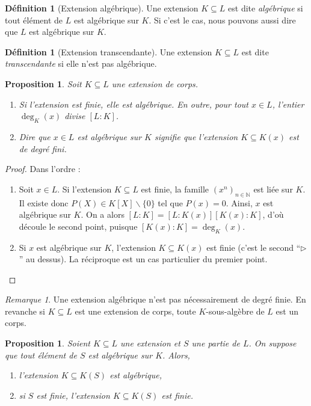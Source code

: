 \documentclass[a4paper, titlepage]{article}
\newtheorem{prop}[theo]{Proposition}
\theoremstyle{definition}
\newtheorem{defi}[theo]{Définition}
\theoremstyle{remark}
\newtheorem{rema}[theo]{Remarque}
\def\N{\mathbb N}
\begin{document}
\begin{defi}[Extension algébrique] Une extension $K \subseteq L$ est dite \textit{algébrique} si tout élément de $L$ est algébrique sur $K$. Si c'est le cas, nous pouvons aussi dire que $L$ est algébrique sur $K$.
\end{defi}

\begin{defi}[Extension transcendante] Une extension $K \subseteq L$ est dite \textit{transcendante} si elle n'est pas algébrique.
\end{defi}

\begin{prop}
Soit $K \subseteq L$ une extension de corps. \begin{enumerate}
\item Si l'extension est finie, elle est algébrique. En outre, pour tout $x \in L$, l'entier $\deg_K(x)$ divise $[L:K]$.
\item Dire que $x\in L$ est algébrique sur $K$ signifie que l'extension $K \subseteq K(x)$ est de degré fini.
\end{enumerate}
\end{prop}

\begin{proof}
Dans l'ordre : \begin{enumerate}
\item Soit $x\in L$. Si l'extension $K \subseteq L$ est finie, la famille ${(x^n)}_{n\in\N}$ est liée sur $K$. Il existe donc $P(X) \in K[X] \backslash \{0\}$ tel que $P(x) = 0$. Ainsi, $x$ est algébrique sur $K$. On a alors $[L:K] = [L:K(x)][K(x):K]$, d'où découle le second point, puisque $[K(x):K] = \deg_K(x)$.
\item Si $x$ est algébrique sur $K$, l'extension $K \subseteq K(x)$ est finie (c'est le second ``$\triangleright$'' au dessus). La réciproque est un cas particulier du premier point.
\end{enumerate}
\end{proof}

\begin{rema}
Une extension algébrique n'est pas nécessairement de degré finie. En revanche si $K \subseteq L$ est une extension de corps, toute $K$-sous-algèbre de $L$ est un corps.
\end{rema}

\begin{prop}
Soient $K \subseteq L$ une extension et $S$ une partie de $L$. On suppose que tout élément de $S$ est algébrique sur $K$. Alors, \begin{enumerate}
\item l'extension $K \subseteq K(S)$ est algébrique,
\item si $S$ est finie, l'extension $K \subseteq K(S)$ est finie.
\end{enumerate}
\end{prop}
\end{document}
